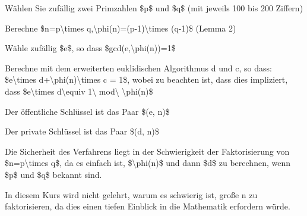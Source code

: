 \documentclass[a4paper]{article}
\begin{document}
\begin{multicols}{3}
\begin{itemize*}
            \begin{itemize*}
                  \item Wählen Sie zufällig zwei Primzahlen \$p\$ und \$q\$ (mit jeweils 100 bis 200 Ziffern)
                  \item Berechne \$n=p\textbackslash times q,\textbackslash phi(n)=(p-1)\textbackslash times (q-1)\$ (Lemma 2)
                  \item Wähle zufällig \$e\$, so dass \$gcd(e,\textbackslash phi(n))=1\$
                  \item Berechne mit dem erweiterten euklidischen Algorithmus d und c, so dass: \$e\textbackslash times d+\textbackslash phi(n)\textbackslash times c = 1\$, wobei zu beachten ist, dass dies impliziert, dass \$e\textbackslash times d\textbackslash equiv 1\textbackslash{} mod\textbackslash{} \textbackslash phi(n)\$
                  \item Der öffentliche Schlüssel ist das Paar \$(e, n)\$
                  \item Der private Schlüssel ist das Paar \$(d, n)\$
            \end{itemize*}
            \item
            Die Sicherheit des Verfahrens liegt in der Schwierigkeit der
            Faktorisierung von \$n=p\textbackslash times q\$, da es einfach ist,
            \$\textbackslash phi(n)\$ und dann \$d\$ zu berechnen, wenn \$p\$ und
            \$q\$ bekannt sind.
            \item
            In diesem Kurs wird nicht gelehrt, warum es schwierig ist, große n zu
            faktorisieren, da dies einen tiefen Einblick in die Mathematik
            erfordern würde.


\end{itemize*}
\end{multicols}
\end{document}
